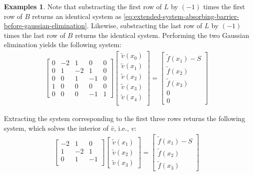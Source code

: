 \documentclass[11pt]{article}
\theoremstyle{definition}
\newtheorem{example}{Examples}[section]
\begin{document}
\begin{example}
	Note that substracting the first row of ${L}$ by $(-1)$ times the first row of $B$ returns an identical system as \eqref{eq:extended-system-absorbing-barrier-before-gaussian-elimination}. Likewise, substracting the last row of ${L}$ by $(-1)$ times the last row of $B$ returns the identical system. Performing the two Gaussian elimination yields the following system:
	\begin{align}\label{eq:extended-system-absorbing-barrier-after-gaussian-elimination}
	\begin{bmatrix}
	0 & -2 & 1 & 0 & 0 \\
	0 & 1 & -2 & 1 & 0 \\
	0 & 0 & 1 & -1 & 0 \\
	1 & 0  & 0 & 0 & 0 \\
	0 & 0 & 0 & -1 & 1
	\end{bmatrix} 	  \begin{bmatrix}
	\tilde{v}(x_0) \\
	\tilde{v}(x_1) \\
	\tilde{v}(x_2) \\
	\tilde{v}(x_3) \\
	\tilde{v}(x_4) \\
	\end{bmatrix}
	=
	\begin{bmatrix}
	\tilde{f}(x_1) - S \\
	\tilde{f}(x_2) \\
	\tilde{f}(x_3) \\
	0 \\
	0
	\end{bmatrix}
	\end{align}

	Extracting the system corresponding to the first three rows returns the following system, which solves the interior of $\bar{v}$, i.e., $v$:
	\begin{align}
	\begin{bmatrix}
	-2 & 1 & 0  \\
	1 & -2 & 1 \\
	0 & 1 & -1 \\
	\end{bmatrix} 	  \begin{bmatrix}
	\tilde{v}(x_1) \\
	\tilde{v}(x_2) \\
	\tilde{v}(x_3)
	\end{bmatrix}
	=
	\begin{bmatrix}
	\tilde{f}(x_1) - S \\
	\tilde{f}(x_2) \\
	\tilde{f}(x_3)
	\end{bmatrix}
	\end{align}
\end{example}
\end{document}
